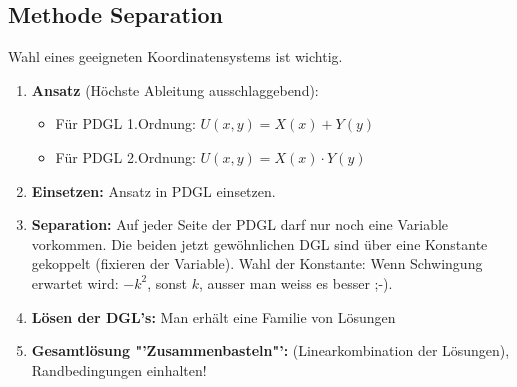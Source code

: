 \subsection{Methode Separation}
Wahl eines geeigneten Koordinatensystems ist wichtig.


\begin{enumerate}
\item \textbf{Ansatz} (Höchste Ableitung ausschlaggebend): 
	\begin{itemize}
		\item Für PDGL 1.Ordnung: $U(x,y)=X(x) + Y(y)$
		\item Für PDGL 2.Ordnung: $U(x,y)=X(x) \cdot Y(y)$ 
	\end{itemize}
\item \textbf{Einsetzen: } Ansatz in PDGL einsetzen.
\item \textbf{Separation: } Auf jeder Seite der PDGL darf nur noch eine Variable vorkommen. Die beiden jetzt gewöhnlichen DGL sind über eine Konstante gekoppelt (fixieren der Variable). Wahl der Konstante: Wenn Schwingung erwartet wird: $-k^2$, sonst $k$, ausser man weiss es besser ;-).
\item \textbf{Lösen der DGL's: } Man erhält eine Familie von Lösungen	
\item \textbf{Gesamtlösung "'Zusammenbasteln"': } (Linearkombination der Lösungen), Randbedingungen einhalten!
\end{enumerate}

